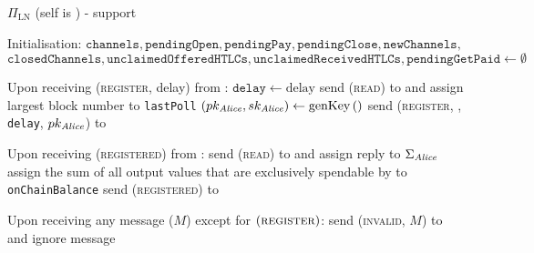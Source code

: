 \begin{protocolbox}{$\Pi_{\mathrm{LN}}$ (self is \alice) - support}
  \label{alg:protocol:support}
  \begin{algorithmic}[1]
    \State Initialisation:
    \Indent
      \State $\mathtt{channels}, \mathtt{pendingOpen}, \mathtt{pendingPay},
      \mathtt{pendingClose}, \mathtt{newChannels},$ $\mathtt{closedChannels},
      \mathtt{unclaimedOfferedHTLCs}, \mathtt{unclaimedReceivedHTLCs},
      \mathtt{pendingGetPaid} \gets \emptyset$
    \EndIndent
    \State

    \State Upon receiving (\textsc{register}, delay) from \environment:
    \Indent
      \State $\mathtt{delay} \gets \mathrm{delay}$
      \State send (\textsc{read}) to \ledger{} and assign largest block number
      to \texttt{lastPoll}
      \State $\left(pk_{\mathit{Alice}}, sk_{\mathit{Alice}}\right) \gets
      \mathrm{genKey}\left(\right)$
      \State send (\textsc{register}, \alice, \texttt{delay},
      $pk_{\mathit{Alice}}$) to \adversary {}
    \EndIndent
    \State

    \State Upon receiving (\textsc{registered}) from \adversary:
    \Indent
      \State send (\textsc{read}) to \ledger{} and assign reply to
      $\Sigma_{\mathit{Alice}}$
      \State assign the sum of all output values that are exclusively spendable
      by \alice{} to \texttt{onChainBalance}
      \State send (\textsc{registered}) to \environment
    \EndIndent
    \State

    \State Upon receiving any message ($M$) except for
    $\left(\textsc{register}\right)$:
    \Indent
        \State send (\textsc{invalid}, $M$) to \adversary{} and ignore message
      \EndIf
    \EndIndent
    \State


\end{algorithmic}
\end{protocolbox}
